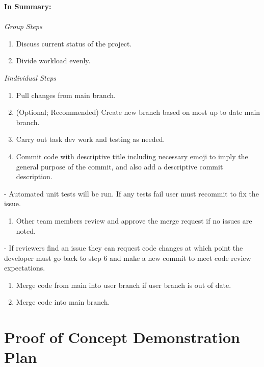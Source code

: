 \documentclass{article}
\begin{document}
\textbf{In Summary:}\\ \\
\textit{Group Steps}
\begin{enumerate}[resume]
  \item Discuss current status of the project.
  \item Divide workload evenly.
  \end{enumerate}
\textit{Iindividual Steps}
\begin{enumerate}[resume]
  \item Pull changes from main branch.
  \item (Optional; Recommended) Create new branch based on most up to date main branch.
  \item Carry out task dev work and testing as needed.
  \item Commit code with descriptive title including necessary emoji to imply the general purpose of the commit, and also add a descriptive commit description.
  \end{enumerate}
  \begin{adjustwidth}{1.3cm}{0cm}
  - Automated unit tests will be run. If any tests fail user must recommit to fix the issue.
  \end{adjustwidth}
\begin{enumerate}[resume]
  \item Other team members review and approve the merge request if no issues are noted.
  \end{enumerate}
  \begin{adjustwidth}{1.3cm}{0cm}
  - If reviewers find an issue they can request code changes at which point the developer must go back to step 6 and make a new commit to meet code review expectations.
  \end{adjustwidth}
\begin{enumerate}[resume]
  \item Merge code from main into user branch if user branch is out of date.
  \item Merge code into main branch.
\end{enumerate}

\newpage
\section{Proof of Concept Demonstration Plan}
\end{document}
